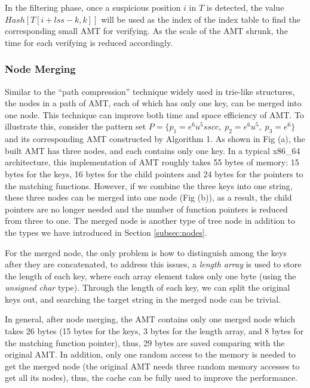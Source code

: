 \documentclass{article}
\begin{document}
In the filtering phase, once a suspicious position $i$ in $T$ is
detected, the value $Hash[T[i+lss-k,k]]$ will be used as the index of
the index table to find the corresponding small AMT for verifying. As
the scale of the AMT shrunk, the time for each verifying is reduced
accordingly.

\subsubsection{Node Merging}
\label{sec:node merge}

Similar to the ``path compression'' technique widely used in trie-like
structures, the nodes in a path of AMT, each of which has only one
key, can be merged into one node. This technique can improve both time
and space efficiency of AMT. To illustrate this, consider the pattern
set $P=\{p_1=e^6u^5sscc,\; p_2=e^6u^5,\; p_3=e^6\}$ and its
corresponding AMT constructed by Algorithm 1. As shown in Fig (a), the
built AMT has three nodes, and each contains only one key. In a
typical x86\_64 architecture, this implementation of AMT roughly takes
55 bytes of memory: 15 bytes for the keys, 16 bytes for the child
pointers and 24 bytes for the pointers to the matching
functions. However, if we combine the three keys into one string,
these three nodes can be merged into one node (Fig (b)), as a result,
the child pointers are no longer needed and the number of function
pointers is reduced from three to one. The merged node is another type
of tree node in addition to the types we have introduced in Section
\ref{subsec:nodes}.

For the merged node, the only problem is how to distinguish among the
keys after they are concatenated, to address this issues, a
\emph{length array} is used to store the length of each key, where
each array element takes only one byte (using the \emph{unsigned char}
type). Through the length of each key, we can split the original keys
out, and searching the target string in the merged node can be
trivial.

In general, after node merging, the AMT contains only one merged node
which takes 26 bytes (15 bytes for the keys, 3 bytes for the length
array, and 8 bytes for the matching function pointer), thus, 29 bytes
are saved comparing with the original AMT. In addition, only one
random access to the memory is needed to get the merged node (the
original AMT needs three random memory accesses to get all its nodes),
thus, the cache can be fully used to improve the performance.
\end{document}

